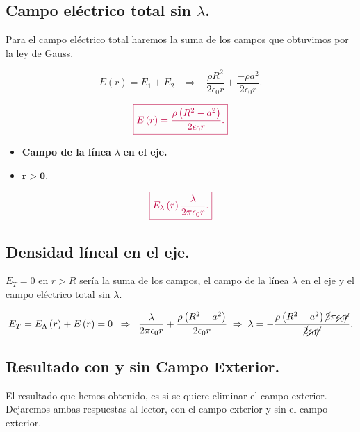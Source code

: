 \documentclass[a4paper,12pt]{article} %
\begin{document}
\subsection{Campo eléctrico total sin \( \lambda\).}

\begin{justify}
	Para el campo eléctrico total haremos la suma de los campos que obtuvimos por la ley de Gauss.
\end{justify}

\[ E\left(r\right) = E_1 + E_2  \;\;\; \Rightarrow \;\;\; \frac{\rho R^2}{2 \epsilon_0 r} + \frac{- \rho a^2}{2 \epsilon_0 r}.\]

\[ \textcolor{purple}{\boxed{E\left(r\right) = \frac{\rho \left(R^2 - a^2\right)}{2 \epsilon_0 r}.}}\]

\begin{justify}
	\begin{itemize}
		\item \textbf{ Campo de la línea} \(\lambda\) \textbf{en el eje.}

		\item \(\mathbf{r > 0}.\)
	\end{itemize}
\end{justify}

\[ \textcolor{purple}{\boxed{E_{\lambda}\left(r\right) \frac{\lambda}{2 \pi \epsilon_0 r}.}} \]

\subsection{Densidad líneal en el eje.}

\begin{justify}
	\(E_T = 0\) en \( r > R\) sería la suma de los campos, el campo de la línea \(\lambda\) en el eje y el campo eléctrico total sin \(\lambda\).
\end{justify}

\[ E_T = E_{\Lambda}\left( r \right) + E\left( r \right) = 0 \;\; \Rightarrow \;\; \frac{\lambda}{2 \pi \epsilon_0 r} + \frac{\rho \left(R^2 - a^2 \right)}{2 \epsilon_0 r} \; \Rightarrow \; \lambda = -\frac{\rho \left(R^2 - a^2\right) \cancel{2} \pi \cancel{\epsilon_0} \cancel{r}}{\cancel{2} \cancel{\epsilon_0} \cancel{r}}.\]

\subsection{Resultado con y sin Campo Exterior.}

\begin{justify}
	El resultado que hemos obtenido, es si se quiere eliminar el campo exterior. Dejaremos ambas respuestas al lector, con el campo exterior y sin el campo exterior.
\end{justify}
\end{document}
